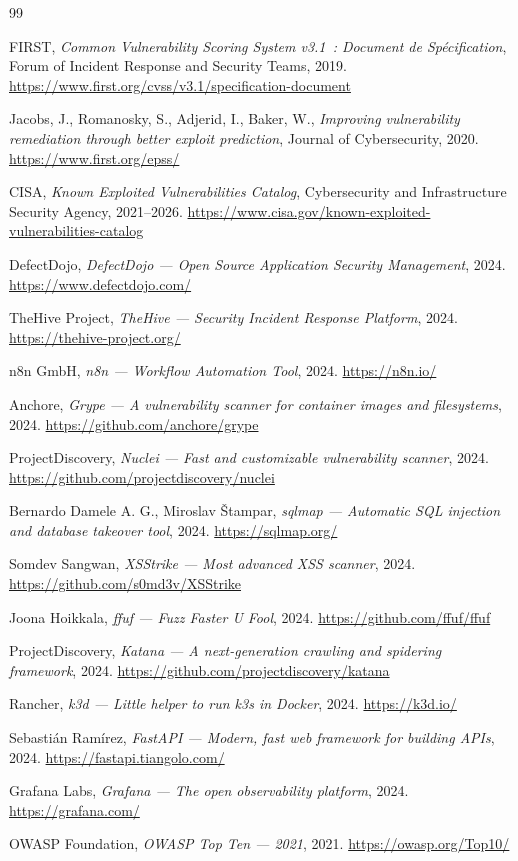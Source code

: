 \documentclass[12pt,a4paper]{report}
\begin{document}
\begin{thebibliography}{99}

 FIRST, \textit{Common Vulnerability Scoring System v3.1~: Document de Spécification}, Forum of Incident Response and Security Teams, 2019. \url{https://www.first.org/cvss/v3.1/specification-document}

 Jacobs, J., Romanosky, S., Adjerid, I., Baker, W., \textit{Improving vulnerability remediation through better exploit prediction}, Journal of Cybersecurity, 2020. \url{https://www.first.org/epss/}

 CISA, \textit{Known Exploited Vulnerabilities Catalog}, Cybersecurity and Infrastructure Security Agency, 2021--2026. \url{https://www.cisa.gov/known-exploited-vulnerabilities-catalog}

 DefectDojo, \textit{DefectDojo --- Open Source Application Security Management}, 2024. \url{https://www.defectdojo.com/}

 TheHive Project, \textit{TheHive --- Security Incident Response Platform}, 2024. \url{https://thehive-project.org/}

 n8n GmbH, \textit{n8n --- Workflow Automation Tool}, 2024. \url{https://n8n.io/}

 Anchore, \textit{Grype --- A vulnerability scanner for container images and filesystems}, 2024. \url{https://github.com/anchore/grype}

 ProjectDiscovery, \textit{Nuclei --- Fast and customizable vulnerability scanner}, 2024. \url{https://github.com/projectdiscovery/nuclei}

 Bernardo Damele A. G., Miroslav \v{S}tampar, \textit{sqlmap --- Automatic SQL injection and database takeover tool}, 2024. \url{https://sqlmap.org/}

 Somdev Sangwan, \textit{XSStrike --- Most advanced XSS scanner}, 2024. \url{https://github.com/s0md3v/XSStrike}

 Joona Hoikkala, \textit{ffuf --- Fuzz Faster U Fool}, 2024. \url{https://github.com/ffuf/ffuf}

 ProjectDiscovery, \textit{Katana --- A next-generation crawling and spidering framework}, 2024. \url{https://github.com/projectdiscovery/katana}

 Rancher, \textit{k3d --- Little helper to run k3s in Docker}, 2024. \url{https://k3d.io/}

 Sebastián Ramírez, \textit{FastAPI --- Modern, fast web framework for building APIs}, 2024. \url{https://fastapi.tiangolo.com/}

 Grafana Labs, \textit{Grafana --- The open observability platform}, 2024. \url{https://grafana.com/}

 OWASP Foundation, \textit{OWASP Top Ten --- 2021}, 2021. \url{https://owasp.org/Top10/}

\end{thebibliography}
\end{document}
